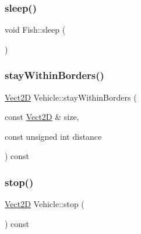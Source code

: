 \mbox{\label{classFish_acac2f4f6c31adfb0c8f4eb78853445bb_acac2f4f6c31adfb0c8f4eb78853445bb}} 
\subsubsection{\texorpdfstring{sleep()}{sleep()}}
{\footnotesize\ttfamily void Fish\+::sleep (\begin{DoxyParamCaption}{ }\end{DoxyParamCaption})\hspace{0.3cm}{\ttfamily [inherited]}}

\mbox{\label{classVehicle_a6149abf3e3f67df45d950562034d0fae_a6149abf3e3f67df45d950562034d0fae}} 
\subsubsection{\texorpdfstring{stay\+Within\+Borders()}{stayWithinBorders()}}
{\footnotesize\ttfamily \hyperlink{classVect2D}{Vect2D} Vehicle\+::stay\+Within\+Borders (\begin{DoxyParamCaption}\item[{const \hyperlink{classVect2D}{Vect2D} \&}]{size,  }\item[{const unsigned int}]{distance }\end{DoxyParamCaption}) const\hspace{0.3cm}{\ttfamily [inherited]}}

\mbox{\label{classVehicle_a9a1cb1e5dab4a474fbe0c1c49482d0ee_a9a1cb1e5dab4a474fbe0c1c49482d0ee}} 
\subsubsection{\texorpdfstring{stop()}{stop()}}
{\footnotesize\ttfamily \hyperlink{classVect2D}{Vect2D} Vehicle\+::stop (\begin{DoxyParamCaption}{ }\end{DoxyParamCaption}) const\hspace{0.3cm}{\ttfamily [inherited]}}

